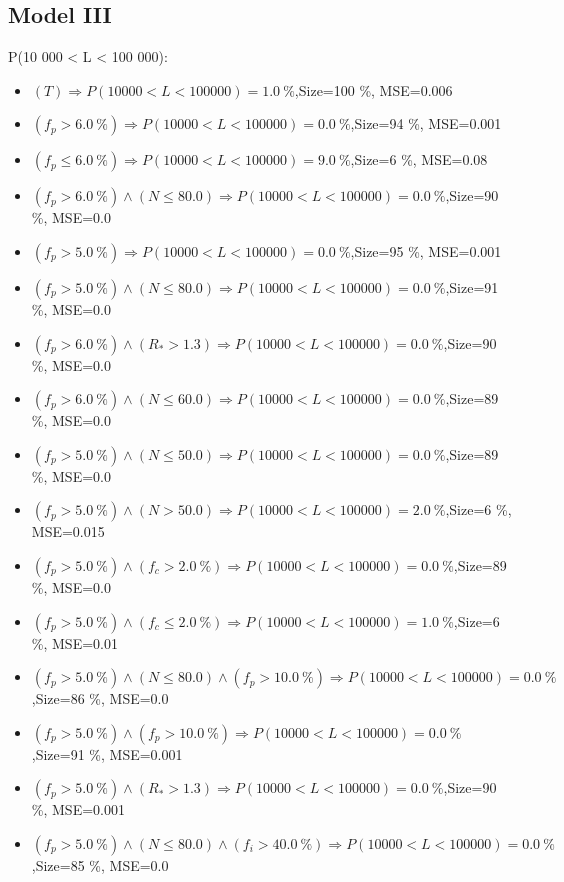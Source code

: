 \documentclass[numbered]{CSL}
\begin{document}
\subsection{Model III}
P(10 000 < L < 100 000):
\begin{itemize}
\item $(T) \Rightarrow P(10 000 < L < 100 000) = 1.0~\%$,\hfill Size=100 \%, MSE=0.006
\item $(f_p > 6.0~\%) \Rightarrow P(10 000 < L < 100 000) = 0.0~\%$,\hfill Size=94 \%, MSE=0.001
\item $(f_p \leq 6.0~\%) \Rightarrow P(10 000 < L < 100 000) = 9.0~\%$,\hfill Size=6 \%, MSE=0.08
\item $(f_p > 6.0~\%) \land (N \leq 80.0) \Rightarrow P(10 000 < L < 100 000) = 0.0~\%$,\hfill Size=90 \%, MSE=0.0
\item $(f_p > 5.0~\%) \Rightarrow P(10 000 < L < 100 000) = 0.0~\%$,\hfill Size=95 \%, MSE=0.001
\item $(f_p > 5.0~\%) \land (N \leq 80.0) \Rightarrow P(10 000 < L < 100 000) = 0.0~\%$,\hfill Size=91 \%, MSE=0.0
\item $(f_p > 6.0~\%) \land (R_* > 1.3) \Rightarrow P(10 000 < L < 100 000) = 0.0~\%$,\hfill Size=90 \%, MSE=0.0
\item $(f_p > 6.0~\%) \land (N \leq 60.0) \Rightarrow P(10 000 < L < 100 000) = 0.0~\%$,\hfill Size=89 \%, MSE=0.0
\item $(f_p > 5.0~\%) \land (N \leq 50.0) \Rightarrow P(10 000 < L < 100 000) = 0.0~\%$,\hfill Size=89 \%, MSE=0.0
\item $(f_p > 5.0~\%) \land (N > 50.0) \Rightarrow P(10 000 < L < 100 000) = 2.0~\%$,\hfill Size=6 \%, MSE=0.015
\item $(f_p > 5.0~\%) \land (f_c > 2.0~\%) \Rightarrow P(10 000 < L < 100 000) = 0.0~\%$,\hfill Size=89 \%, MSE=0.0
\item $(f_p > 5.0~\%) \land (f_c \leq 2.0~\%) \Rightarrow P(10 000 < L < 100 000) = 1.0~\%$,\hfill Size=6 \%, MSE=0.01
\item $(f_p > 5.0~\%) \land (N \leq 80.0) \land (f_p > 10.0~\%) \Rightarrow P(10 000 < L < 100 000) = 0.0~\%$,\hfill Size=86 \%, MSE=0.0
\item $(f_p > 5.0~\%) \land (f_p > 10.0~\%) \Rightarrow P(10 000 < L < 100 000) = 0.0~\%$,\hfill Size=91 \%, MSE=0.001
\item $(f_p > 5.0~\%) \land (R_* > 1.3) \Rightarrow P(10 000 < L < 100 000) = 0.0~\%$,\hfill Size=90 \%, MSE=0.001
\item $(f_p > 5.0~\%) \land (N \leq 80.0) \land (f_i > 40.0~\%) \Rightarrow P(10 000 < L < 100 000) = 0.0~\%$,\hfill Size=85 \%, MSE=0.0

\end{itemize}
\end{document}
